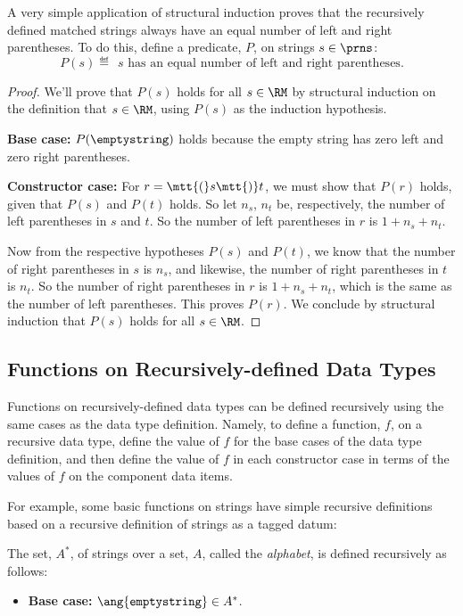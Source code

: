 \begin{definition}
A very simple application of structural induction proves that the
recursively defined matched strings always have an equal number of left
and right parentheses.  To do this, define a predicate, $P$, on strings $s
\in \prns$:
\[
P(s) \eqdef\ \ s \text{ has an equal number of left and right parentheses}.
\]
\begin{proof}

  We'll prove that $P(s)$ holds for all $s \in\RM$ by structural induction
  on the definition that $s \in\RM$, using $P(s)$ as the induction
  hypothesis.

\textbf{Base case:} $P(\emptystring)$ holds because the empty string has zero
left and zero right parentheses.

\textbf{Constructor case:} For $r = \mtt{(}s\mtt{)}t$, we must show
that $P(r)$ holds, given that $P(s)$ and $P(t)$ holds.  So let $n_s$,
$n_t$ be, respectively, the number of left parentheses in $s$ and $t$.  So
the number of left parentheses in $r$ is $1+n_s+n_t$.

Now from the respective hypotheses $P(s)$ and $P(t)$, we know that the
number of right parentheses in $s$ is $n_s$, and likewise, the number of
right parentheses in $t$ is $n_t$.  So the number of right parentheses in
$r$ is $1+n_s+n_t$, which is the same as the number of left parentheses.
This proves $P(r)$.  We conclude by structural induction that $P(s)$ holds
for all $s \in\RM$.
\end{proof}

\subsection{Functions on Recursively-defined Data Types}

Functions on recursively-defined data types can be defined recursively
using the same cases as the data type definition.  Namely, to define a
function, $f$, on a recursive data type, define the value of $f$ for the
base cases of the data type definition, and then define the value of $f$
in each constructor case in terms of the values of $f$ on the component
data items.

\iffalse

For example, some basic functions on strings have simple recursive
definitions based on a recursive definition of strings as a tagged datum:

\begin{definition}\label{A*}
The set, $A^*$, of strings over a set, $A$, called the \emph{alphabet},
is defined recursively as follows:
\begin{itemize}
\item \textbf{Base case:} $\ang{\texttt{emptystring}} \in A^*$.


\end{itemize}
\end{definition}
\end{definition}
